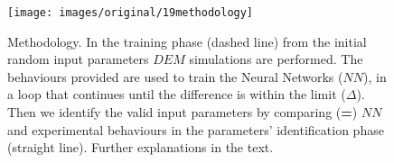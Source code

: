 \begin{figure}[!htb] 
\centering 
\texttt{[image: images/original/19methodology]} 
\caption[Methodology]{Methodology. 
In the training phase (dashed line) from the initial random input parameters
$DEM$ simulations are performed. The behaviours provided are used to train the
Neural Networks ($NN$), in a loop that continues until the difference is within
the limit ($\Delta$).
Then we identify the valid input parameters by comparing (\textbf{=}) $NN$ and
experimental behaviours in the parameters' identification phase (straight line).
Further explanations in the text.
}
\label{fig:19methodology} 
\end{figure}





